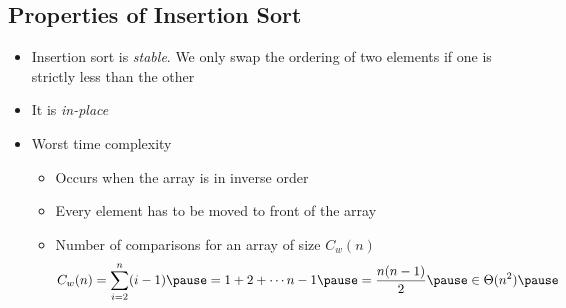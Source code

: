 
\begin{slide}
\section[-1]{Properties of Insertion Sort}

\begin{PauseHighLight}
  \begin{itemize}
  \item Insertion sort is \emph{stable}.  We only swap the ordering of
    two elements if one is strictly less than the other\pause
  \item It is \emph{in-place}\pause
  \item Worst time complexity\pause
    \begin{itemize}
    \item Occurs when the array is in inverse order\pause
    \item Every element has to be moved to front of the array\pause
    \item Number of comparisons for an array of size $C_w(n)$
      \begin{align*}
        C_w(n) = \sum_{i=2}^n (i-1) \pause= 1 + 2 + \cdots n-1 \pause
        = \frac{n(n-1)}{2}\pause \in \Theta(n^2) \pause
      \end{align*}
    \end{itemize}
  \end{itemize}
\end{PauseHighLight}

\end{slide}


